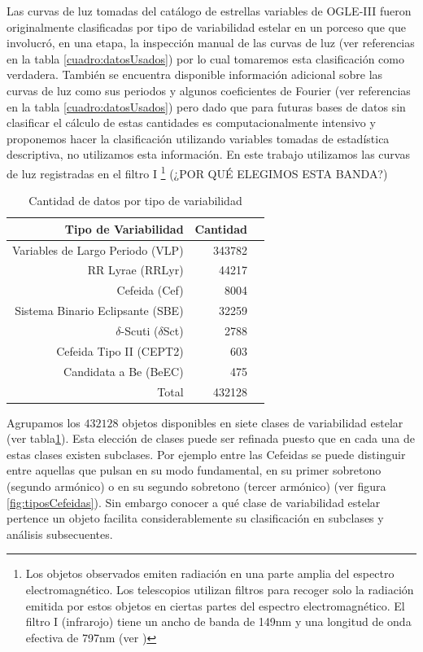 \documentclass[letterpaper,12pt]{book}
\begin{document}
Las curvas de luz tomadas del catálogo de estrellas variables de OGLE-III fueron originalmente clasificadas por tipo de variabilidad estelar en un porceso que que involucró, en una etapa, la inspección manual de las curvas de luz (ver referencias en la tabla \ref{cuadro:datosUsados}) por lo cual tomaremos esta clasificación como verdadera. También se encuentra disponible información adicional sobre las curvas de luz como sus periodos y algunos coeficientes de Fourier (ver referencias en la tabla \ref{cuadro:datosUsados}) pero dado que para futuras bases de datos sin clasificar el cálculo de estas cantidades es computacionalmente intensivo y proponemos hacer la clasificación utilizando variables tomadas de estadística descriptiva, no utilizamos esta información. En este trabajo utilizamos las curvas de luz registradas en el filtro I \footnote{Los objetos observados emiten radiación en una parte amplia del espectro electromagnético. Los telescopios utilizan filtros para recoger solo la radiación emitida por estos objetos en ciertas partes del espectro electromagnético. El filtro I (infrarojo) tiene un ancho de banda de 149nm y una longitud de onda efectiva de 797nm (ver \cite{karttunen_fundamental_2007})} (¿POR QUÉ ELEGIMOS ESTA BANDA?)

\begin{table}[ht]
  \centering
  \caption{Cantidad de datos por tipo de variabilidad}
  \label{cuadro:cantidadDatos}
  \begin{tabular}{rrr}
    \hline
    Tipo de Variabilidad & Cantidad \\
    \hline
    Variables de Largo Periodo (VLP) & 343782 \\
    RR Lyrae (RRLyr) & 44217\\
    Cefeida (Cef)& 8004\\
    Sistema Binario Eclipsante (SBE)&32259 \\
    $\delta$-Scuti ($\delta$Sct)& 2788\\
    Cefeida Tipo II (CEPT2)& 603\\
    Candidata a Be (BeEC)& 475\\
    \hline
    Total & 432128\\
    \hline
  \end{tabular}
\end{table}

Agrupamos los $432128$ objetos disponibles en siete clases de variabilidad estelar (ver tabla\ref{cuadro:cantidadDatos}). Esta elección de clases puede ser refinada puesto que en cada una de estas clases existen subclases. Por ejemplo entre las Cefeidas se puede distinguir entre aquellas que pulsan en su modo fundamental, en su primer sobretono (segundo armónico) o en su segundo sobretono (tercer armónico)  (ver figura \ref{fig:tiposCefeidas}). Sin embargo conocer a qué clase de variabilidad estelar pertence un objeto facilita considerablemente su clasificación en subclases y análisis subsecuentes. 
\end{document}

